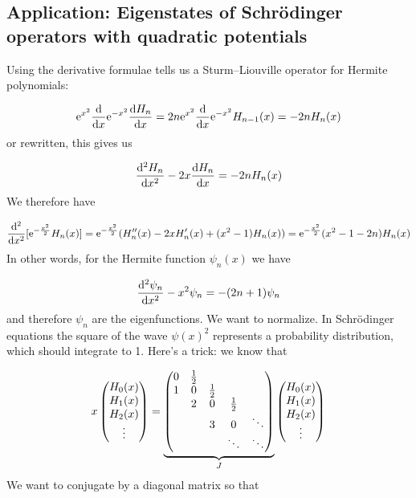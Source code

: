 \documentclass[12pt,landscape]{article}
\def\half{ {1 \over 2} }
\def\D{ {\rm d} }
\def\E{ {\rm e} }
\def\dx{\D x}
\def\endash{–}
\begin{document}
{\newpage

\subsection{Application:  Eigenstates of Schrödinger operators with quadratic potentials}
Using the derivative formulae tells us a Sturm\ensuremath{\endash}Liouville operator for Hermite polynomials:

\[
\E^{x^2} {\D \over \dx} \E^{-x^2} {\D H_n \over \dx} = 2n \E^{x^2} {\D \over \dx} \E^{-x^2} H_{n-1}(x) = -2nH_n(x)
\]
or rewritten, this gives us

\[
{\D^2 H_n \over \dx^2} -2x {\D H_n \over \dx} = -2nH_n(x)
\]
We therefore have

\[
{\D^2 \over \dx^2}[\E^{-{x^2 \over 2}} H_n(x)] = \E^{-{x^2 \over 2}} (H_n''(x)  -2x H_n'(x) + (x^2-1) H_n(x)) = \E^{-{x^2 \over 2}} (x^2-1-2n) H_n(x)
\]
In other words, for the Hermite function $\psi_n(x)$ we have

\[
{\D^2 \psi_n \over \dx^2} -x^2 \psi_n = -(2n+1) \psi_n
\]
and therefore $\psi_n$ are the eigenfunctions.
\newpage
We want to normalize.  In Schrödinger equations the square of the wave $\psi(x)^2$ represents a probability distribution, which should integrate to 1. Here's a trick: we know that

\[
x \begin{pmatrix} H_0(x) \\ H_1(x) \\ H_2(x) \\ \vdots \end{pmatrix} = \underbrace{\begin{pmatrix} 0 & {1 \over 2} \\
1 & 0 & \half \\
& 2 & 0 & \half \\
&& 3 & 0 & \ddots \\
&&& \ddots & \ddots
\end{pmatrix}}_J\begin{pmatrix} H_0(x) \\ H_1(x) \\ H_2(x) \\ \vdots \end{pmatrix}
\]
We want to conjugate by a diagonal matrix so that

}
\end{document}
